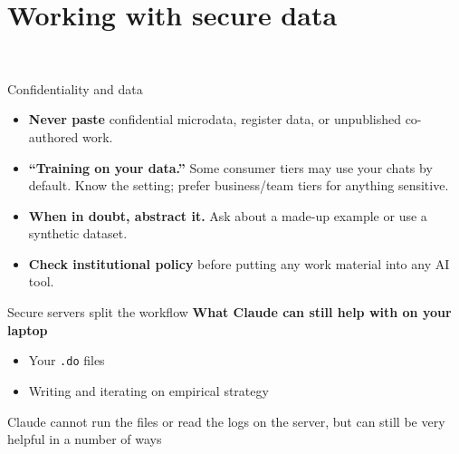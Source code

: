 \documentclass[aspectratio=169, 10pt]{beamer}
\begin{document}
\section{Working with secure data}
\sourceline{}

\begin{frame}
\centering
   \\ 
  \bigskip 
\end{frame}


\begin{frame}{Confidentiality and data}
\begin{itemize}
  \item \textbf{Never paste} confidential microdata, register data, or unpublished co-authored work.
  \item \textbf{``Training on your data.''} Some consumer tiers may use your chats by default.
        Know the setting; prefer business/team tiers for anything sensitive.
  \item \textbf{When in doubt, abstract it.} Ask about a made-up example or use a   synthetic dataset.
  \item \textbf{Check institutional policy} before putting any work material into any AI tool.
\end{itemize}
\end{frame}

% 

\begin{frame}{Secure servers split the workflow}
\vskip0.2cm
\textbf{What Claude can still help with on your laptop}
\begin{itemize}
  \item Your \texttt{.do} files
  \item Writing and iterating on empirical strategy 
\end{itemize}
\bigskip
Claude cannot run the files or read the logs on the server, but can still be very helpful in a number of ways 

\end{frame}
\end{document}
